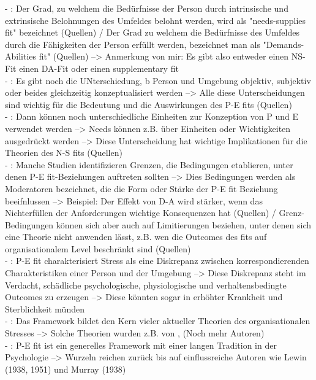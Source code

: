- \cite[S. 4]{edwards:2008}: Der Grad, zu welchem die Bedürfnisse der Person durch intrinsische und extrinsische Belohnungen des Umfeldes belohnt werden, wird als "needs-supplies fit" bezeichnet (Quellen) / Der Grad zu welchem die Bedürfnisse des Umfeldes durch die Fähigkeiten der Person erfüllt werden, bezeichnet man als "Demands-Abilities fit" (Quellen) --> Anmerkung von mir: Es gibt also entweder einen NS-Fit einen DA-Fit oder einen supplementary fit \\
- \cite[S. 5]{edwards:2008}: Es gibt noch die UNterschiedung, b Person und Umgebung objektiv, subjektiv oder beides gleichzeitig konzeptualisiert werden --> Alle diese Unterscheidungen sind wichtig für die Bedeutung und die Auswirkungen des P-E fits (Quellen) \\
- \cite[S. 5]{edwards:2008}: Dann können noch unterschiedliche Einheiten zur Konzeption von P und E verwendet werden --> Needs können z.B. über Einheiten oder Wichtigkeiten ausgedrückt werden --> Diese Unterscheidung hat wichtige Implikationen für die Theorien des N-S fits (Quellen) \\
- \cite[S. 6]{edwards:2008}: Manche Studien identifizieren Grenzen, die Bedingungen etablieren, unter denen P-E fit-Beziehungen auftreten sollten --> Dies Bedingungen werden als Moderatoren bezeichnet, die die Form oder Stärke der P-E fit Beziehung beeifnlussen --> Beispiel: Der Effekt von D-A wird stärker, wenn das Nichterfüllen der Anforderungen wichtige Konsequenzen hat (Quellen) / Grenz-Bedingungen können sich aber auch auf Limitierungen beziehen, unter denen sich eine Theorie nicht anwenden lässt, z.B. wen die Outcomes des fits auf organisationalem Level beschränkt sind (Quellen) \\
- \cite[S. 1]{edwards:1990}: P-E fit charakterisiert Stress als eine Diskrepanz zwischen korrespondierenden Charakteristiken einer Person und der Umgebung --> Diese Diskrepanz steht im Verdacht, schädliche psychologische, physiologische und verhaltensbedingte Outcomes zu erzeugen --> Diese könnten sogar in erhöhter Krankheit und Sterblichkeit münden \\
- \cite[S. 1]{edwards:1990}: Das Framework bildet den Kern vieler aktueller Theorien des organisationalen Stresses  --> Solche Theorien wurden z.B. von \textcite{copingAndAdaption:1974}, \textcite{mechanismsOfJobStressAndStrain:1982} (Noch mehr Autoren) \\
- \cite[S. 1]{edwards:1990}: P-E fit ist ein generelles Framework mit einer langen Tradition in der Psychologie --> Wurzeln reichen zurück bis auf einflussreiche Autoren wie Lewin (1938, 1951) und Murray (1938) \\
